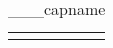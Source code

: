 \begin{table}[ht]
\begin{center}
\caption{___capname}
\begin{tabular}{|c|c|c|c|}\hline
 & & & & \\ \hline
 & & & & \\ \hline
\end{tabular}
\label{___tab}
\end{center}
\end{table}
